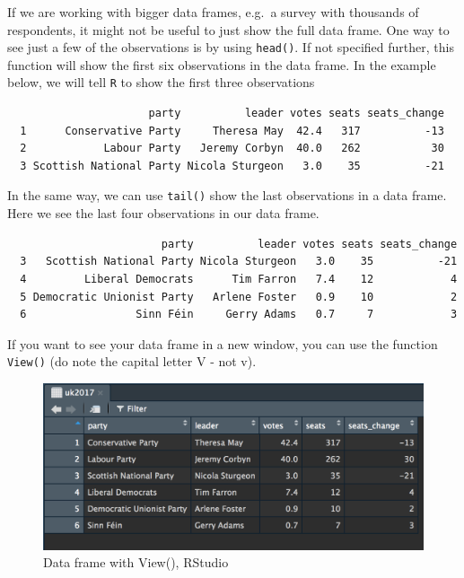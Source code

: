 \documentclass[12pt,oneside]{reedthesis}
\theoremstyle{definition}
\theoremstyle{definition}
\theoremstyle{definition}
\theoremstyle{remark}
\begin{document}
  If we are working with bigger data frames, e.g.~a survey with thousands
  of respondents, it might not be useful to just show the full data frame.
  One way to see just a few of the observations is by using
  \texttt{head()}. If not specified further, this function will show the
  first six observations in the data frame. In the example below, we will
  tell \texttt{R} to show the first three observations
  \begin{Shaded}
  \begin{Highlighting}[]
  \NormalTok{)  }
  \end{Highlighting}
  \end{Shaded}
  \begin{verbatim}
                      party          leader votes seats seats_change
  1      Conservative Party     Theresa May  42.4   317          -13
  2            Labour Party   Jeremy Corbyn  40.0   262           30
  3 Scottish National Party Nicola Sturgeon   3.0    35          -21
  \end{verbatim}
  In the same way, we can use \texttt{tail()} show the last observations
  in a data frame. Here we see the last four observations in our data
  frame.
  \begin{Shaded}
  \begin{Highlighting}[]
  \NormalTok{)  }
  \end{Highlighting}
  \end{Shaded}
  \begin{verbatim}
                        party          leader votes seats seats_change
  3   Scottish National Party Nicola Sturgeon   3.0    35          -21
  4         Liberal Democrats      Tim Farron   7.4    12            4
  5 Democratic Unionist Party   Arlene Foster   0.9    10            2
  6                 Sinn Féin     Gerry Adams   0.7     7            3
  \end{verbatim}
  If you want to see your data frame in a new window, you can use the
  function \texttt{View()} (do note the capital letter V - not v).
  \begin{Shaded}
  \begin{Highlighting}[]
  \end{Highlighting}
  \end{Shaded}
  \begin{figure}
  \includegraphics[scale=0.65]{fig/View} \caption{Data frame with View(), RStudio}\label{fig:View}
  \end{figure}
\end{document}
